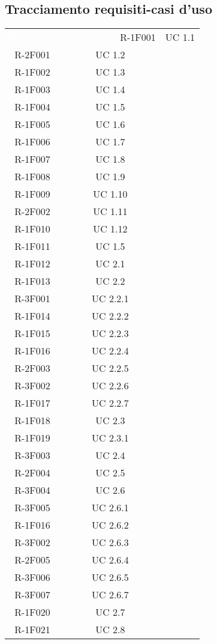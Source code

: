 \subsection{Tracciamento requisiti-casi d'uso} 

\begin{tabularx}{\textwidth}{c|c}
	\rowcolor{greySWEight}
	\textcolor{white}{\textbf{Requisito}} &
	\textcolor{white}{\textbf{Caso d'uso}}\endhead
		R-1F001 & UC 1.1 \\
		R-2F001 & UC 1.2 \\
		R-1F002 & UC 1.3 \\
		R-1F003 & UC 1.4 \\
		R-1F004 & UC 1.5 \\
		R-1F005 & UC 1.6 \\
		R-1F006 & UC 1.7 \\
		R-1F007 & UC 1.8 \\
		R-1F008 & UC 1.9 \\
		R-1F009 & UC 1.10 \\
		R-2F002 & UC 1.11 \\
		R-1F010 & UC 1.12 \\
		R-1F011 & UC 1.5 \\
		R-1F012 & UC 2.1 \\
		R-1F013 & UC 2.2 \\
		R-3F001 & UC 2.2.1 \\
		R-1F014 & UC 2.2.2 \\
		R-1F015 & UC 2.2.3 \\
		R-1F016 & UC 2.2.4 \\
		R-2F003 & UC 2.2.5 \\
		R-3F002 & UC 2.2.6 \\
		R-1F017 & UC 2.2.7 \\
		R-1F018 & UC 2.3 \\
		R-1F019 & UC 2.3.1 \\
		R-3F003 & UC 2.4 \\
		R-2F004 & UC 2.5 \\
		R-3F004 & UC 2.6 \\
		R-3F005 & UC 2.6.1 \\
		R-1F016 & UC 2.6.2 \\
		R-3F002 & UC 2.6.3 \\
		R-2F005 & UC 2.6.4 \\
		R-3F006 & UC 2.6.5 \\
		R-3F007 & UC 2.6.7 \\
		R-1F020 & UC 2.7 \\
		R-1F021 & UC 2.8 \\

\end{tabularx}
